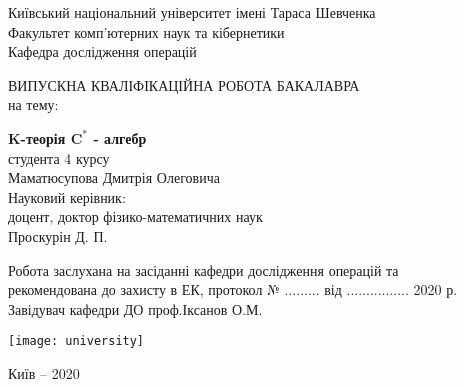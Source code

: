 \begin{titlepage}
    \begin{center}

        Київський національний університет імені Тараса Шевченка\\
        Факультет комп’ютерних наук та кібернетики\\
        Кафедра дослідження операцій\\

        \vspace*{5cm}

        ВИПУСКНА КВАЛІФІКАЦІЙНА РОБОТА БАКАЛАВРА\\
        на тему:\\

        \vspace*{1cm}

        \textbf{K-теорія $\mathbf{C^*}$ - алгебр}\\

        \vspace{1.5cm}
        \hspace{6cm}
        студента 4 курсу\\
        \hspace{6cm}
        Маматюсупова Дмитрія Олеговича\\

        \vspace{1.5cm}
        \hspace{6cm}
        Науковий керівник:\\
        \hspace{6cm}
        доцент, доктор фізико-математичних наук\\
        \hspace{6cm}
        Проскурін Д. П.\\


        \vspace{3cm}

        Робота заслухана на засіданні кафедри дослідження операцій та\\
        рекомендована до захисту в ЕК, протокол № ......... від ................ 2020 р.\\

        \vspace{1cm}
        Завідувач кафедри ДО \hspace{5cm}   проф.Іксанов О.М.

        \vspace{1cm}
        \vfill


        \vspace{0.8cm}

        \texttt{[image: university]}

        Київ -- 2020

    \end{center}
\end{titlepage}
